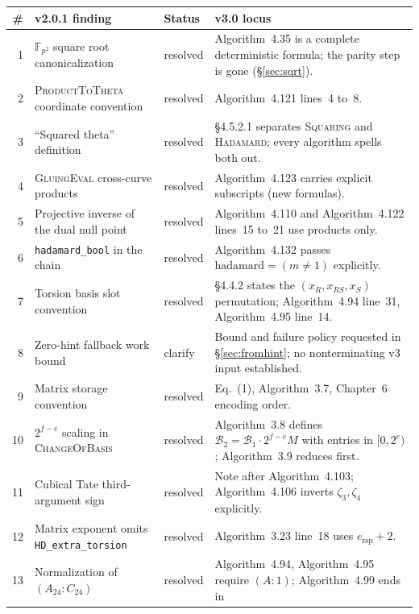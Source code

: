 \documentclass[a4paper,11pt]{article}
\newcommand{\algo}[1]{Algorithm~#1}
\newcommand{\Fpii}{\mathbb{F}_{p^2}}
\newcommand{\code}[1]{\texttt{#1}}
\begin{document}
\begingroup
\small
\setlength{\tabcolsep}{4pt}
\begin{longtable}{@{}r >{\raggedright\arraybackslash}p{}
  >{\raggedright\arraybackslash}p{}
  >{\raggedright\arraybackslash}p{}@{}}
\toprule
\# & v2.0.1 finding & Status & v3.0 locus \\
\midrule
\endhead
1 & $\Fpii$ square root canonicalization & resolved &
  \algo{4.35} is a complete deterministic formula; the parity step is
  gone (\S\ref{sec:sqrt}). \\
2 & \textsc{ProductToTheta} coordinate convention & resolved &
  \algo{4.121} lines~4 to~8. \\
3 & ``Squared theta'' definition & resolved &
  \S4.5.2.1 separates \textsc{Squaring} and \textsc{Hadamard}; every
  algorithm spells both out. \\
4 & \textsc{GluingEval} cross-curve products & resolved &
  \algo{4.123} carries explicit subscripts (new formulas). \\
5 & Projective inverse of the dual null point & resolved &
  \algo{4.110} and \algo{4.122} lines~15 to~21 use products only. \\
6 & \code{hadamard\_\allowbreak{}bool} in the chain & resolved &
  \algo{4.132} passes $\mathrm{hadamard} = (m \ne 1)$ explicitly. \\
7 & Torsion basis slot convention & resolved &
  \S4.4.2 states the $(x_R, x_{RS}, x_S)$ permutation; \algo{4.94}
  line~31, \algo{4.95} line~14. \\
8 & Zero-hint fallback work bound & clarify &
  Bound and failure policy requested in \S\ref{sec:fromhint};
  no nonterminating v3 input established. \\
9 & Matrix storage convention & resolved &
  Eq.~(1), \algo{3.7}, Chapter~6 encoding order. \\
10 & $2^{f-e}$ scaling in \textsc{ChangeOfBasis} & resolved &
  \algo{3.8} defines $\mathcal{B}_2 = \mathcal{B}_1 \cdot 2^{f-e} M$
  with entries in $[0, 2^e)$; \algo{3.9} reduces first. \\
11 & Cubical Tate third-argument sign & resolved &
  Note after \algo{4.103}; \algo{4.106} inverts $\zeta_3, \zeta_4$
  explicitly. \\
12 & Matrix exponent omits \code{HD\_\allowbreak{}extra\_\allowbreak{}torsion} & resolved &
  \algo{3.23} line~18 uses $e_{\mathrm{rsp}} + 2$. \\
13 & Normalization of $(A_{24} : C_{24})$ & resolved &
  \algo{4.94}, \algo{4.95} require $(A : 1)$; \algo{4.99} ends in

\end{longtable}
\end{document}
